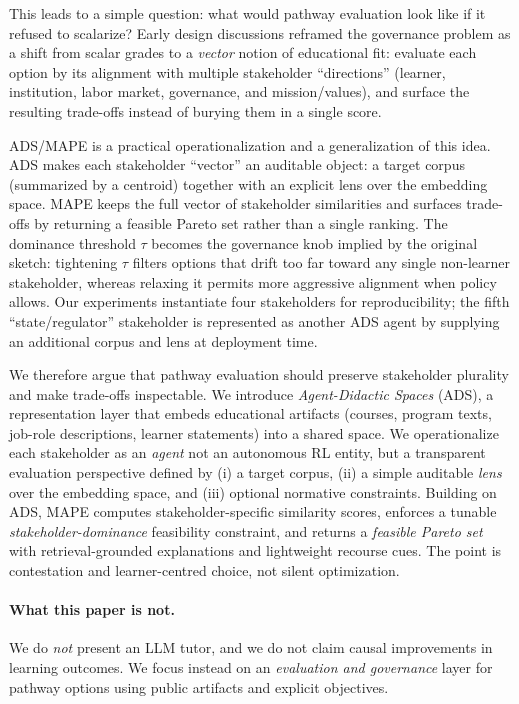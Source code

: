 \documentclass{article}
\newcommand{\ADS}{\textsc{ADS}\xspace}
\newcommand{\MAPE}{\textsc{MAPE}\xspace}
\begin{document}
This leads to a simple question: what would pathway evaluation look like if it refused to scalarize? Early design discussions reframed the governance problem as a shift from scalar grades to a \emph{vector} notion of educational fit: evaluate each option by its alignment with multiple stakeholder ``directions'' (learner, institution, labor market, governance, and mission/values), and surface the resulting trade-offs instead of burying them in a single score.

\ADS/\MAPE is a practical operationalization   and a generalization   of this idea. \ADS makes each stakeholder ``vector'' an auditable object: a target corpus (summarized by a centroid) together with an explicit lens over the embedding space. \MAPE keeps the full vector of stakeholder similarities and surfaces trade-offs by returning a feasible Pareto set rather than a single ranking. The dominance threshold $\tau$ becomes the governance knob implied by the original sketch: tightening $\tau$ filters options that drift too far toward any single non-learner stakeholder, whereas relaxing it permits more aggressive alignment when policy allows. Our experiments instantiate four stakeholders for reproducibility; the fifth ``state/regulator'' stakeholder is represented as another \ADS agent by supplying an additional corpus and lens at deployment time.

We therefore argue that pathway evaluation should preserve stakeholder plurality and make trade-offs inspectable. We introduce \emph{Agent-Didactic Spaces} (\ADS), a representation layer that embeds educational artifacts (courses, program texts, job-role descriptions, learner statements) into a shared space. We operationalize each stakeholder as an \emph{agent}   not an autonomous RL entity, but a transparent evaluation perspective defined by (i) a target corpus, (ii) a simple auditable \emph{lens} over the embedding space, and (iii) optional normative constraints. Building on \ADS, \MAPE computes stakeholder-specific similarity scores, enforces a tunable \emph{stakeholder-dominance} feasibility constraint, and returns a \emph{feasible Pareto set} with retrieval-grounded explanations and lightweight recourse cues. The point is contestation and learner-centred choice, not silent optimization.

\paragraph{What this paper is not.}
We do \emph{not} present an LLM tutor, and we do not claim causal improvements in learning outcomes. We focus instead on an \emph{evaluation and governance} layer for pathway options using public artifacts and explicit objectives.
\end{document}
